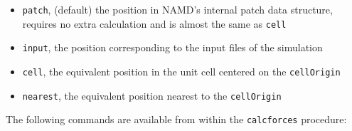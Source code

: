 \begin{itemize}

\item
{\tt patch}, (default) the position in NAMD's internal patch data structure,
requires no extra calculation and is almost the same as {\tt cell}

\item
{\tt input}, the position corresponding to the input files of the simulation

\item
{\tt cell}, the equivalent position in the unit cell centered on the {\tt cellOrigin}

\item
{\tt nearest}, the equivalent position nearest to the {\tt cellOrigin}

\end{itemize}

The following commands are available from within the {\tt calcforces} procedure:

